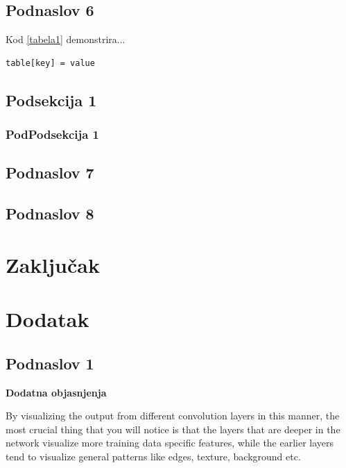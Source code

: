 \documentclass[a4paper]{article}
\begin{document}
\subsection{Podnaslov 6}
\label{sec:podnaslov6}

Kod \ref{tabela1} demonstrira...

\begin{lstlisting}[caption={Primer koda},frame=single, label=tabela1]
table[key] = value
\end{lstlisting}


\subsection*{Podsekcija 1}


\subsubsection*{PodPodsekcija 1}


\subsection{Podnaslov 7}
\label{sec:podnaslov7}


\subsection{Podnaslov 8}
\label{sec:podnaslov8}


\section{Zaključak}
\label{sec:zakljucak}

\appendix
 


\appendix
\section{Dodatak}
\subsection{Podnaslov 1}

\textbf{Dodatna objasnjenja} %


By visualizing the output from different convolution layers in this manner, the most crucial thing that you will notice is that the layers that are deeper in the network visualize more training data specific features, while the earlier layers tend to visualize general patterns like edges, texture, background etc.
\end{document}
